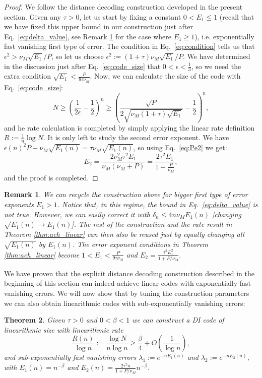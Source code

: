 \documentclass[10pt,conference]{IEEEtran}
\newtheorem{theorem}{Theorem}
\newtheorem{remark}[theorem]{Remark}
\newcommand{\1}{\mathds{1}}
\begin{document}
\begin{proof}
We follow the distance decoding construction developed in the present section. Given any $\tau>0$, let us start by fixing a constant $0<E_1\leq1$ (recall that we have fixed this upper bound in our construction just after Eq.~\eqref{eq:delta_value}, see Remark \ref{cor:big_exp} for the case where $E_1\geq1$), i.e. exponentially fast vanishing first type of error. The condition in Eq.~\eqref{eq:condition} tells us that $\epsilon^2>\nu_M\sqrt{E_1}/P$, so let us choose $\epsilon^2:=(1+\tau)\nu_M\sqrt{E_1}/P$. We have determined in the discussion just after Eq.~\eqref{eq:code_size} that $0<\epsilon<\frac13$, so we need the extra condition $\sqrt{E_1}<\frac{P}{9\tau\nu_M}$. Now, we can calculate the size of the code with Eq.~\eqref{eq:code_size}:
\begin{equation*}
N\geq\left(\frac{1}{2\epsilon}-\frac12\right)^n\geq\left(\frac{\sqrt{P}}{2\sqrt{\nu_M(1+\tau)\sqrt{E_1}}}-\frac12\right)^n,
\end{equation*}
and he rate calculation is completed by simply applying the linear rate definition $R:=\frac1n\log N$.
It is only left to study the second error exponent. We have $\epsilon(n)^2P-\nu_M\sqrt{E_1(n)}=\tau\nu_M\sqrt{E_1(n)}$, so using Eq.~\eqref{eq:Pe2} we get:
\[
E_2=\frac{2\nu_M^2\tau^2E_1}{\nu_M(\nu_M+P)}=\frac{2\tau^2E_1}{1+\frac{P}{\nu_M}},
\]
and the proof is completed.
\end{proof}

\begin{remark}\label{cor:big_exp}
We can recycle the construction above for bigger first type of error exponents $E_1>1$. Notice that, in this regime, the bound in Eq.~\eqref{eq:delta_value} is not true. However, we can easily correct it with $\delta_n\leq4n\nu_ME_1(n)$ [changing $\sqrt{E_1(n)}\to E_1(n)$]. The rest of the construction and the rate result in Theorem \ref{thm:ach_linear} can then also be reused just by equally changing all $\sqrt{E_1(n)}$ by $E_1(n)$. The error exponent conditions in Theorem \ref{thm:ach_linear} become $1<E_1<\frac{P}{9\tau\nu_M}$ and $E_2=\frac{\tau^2E_1^2}{1+P/\nu_M}$.
\end{remark}

We have proven that the explicit distance decoding construction described in the beginning of this section can indeed achieve linear codes with exponentially fast vanishing errors. We will now show that by tuning the construction parameters we can also obtain linearithmic codes with sub-exponentially vanishing errors:
\begin{theorem}\label{thm:achievability_linearithmic}
Given $\tau>0$ and $0<\beta<1$ we can construct a DI code of linearithmic size with linearithmic rate
\[
\frac{R(n)}{\log n}:=\frac{\log N}{n\log n}\geq\frac{\beta}{4}+O\left(\frac{1}{\log n}\right),
\]
and sub-exponentially fast vanishing errors $\lambda_1:=e^{-nE_1(n)}$ and $\lambda_2:=e^{-nE_2(n)}$, with $E_1(n)=n^{-\beta}$ and $E_2(n)=\frac{2\tau^2n}{1+P/\nu_M}n^{-\beta}$.
\end{theorem}
\end{document}
